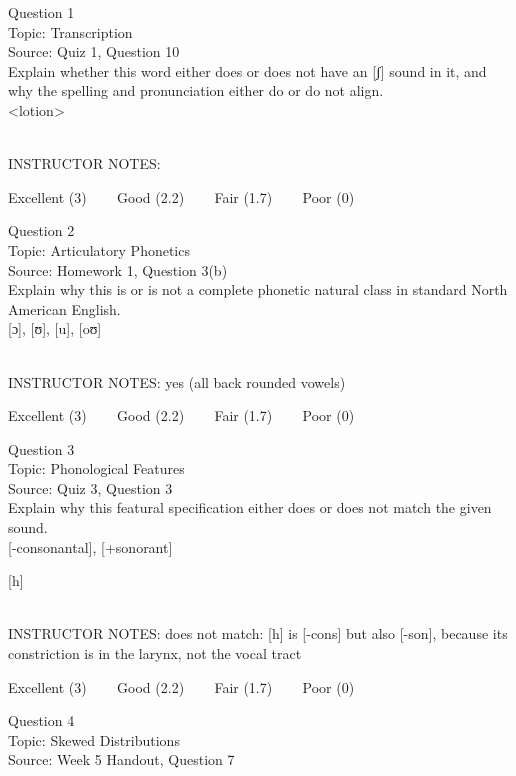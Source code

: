 \documentclass[12pt]{article}
\begin{document}
{\large Question 1}\\

Topic: Transcription\\
Source: Quiz 1, Question 10\\

Explain whether this word either does or does not have an [ʃ] sound in it, and why the spelling and pronunciation either do or do not align.\\

<lotion>


~\\
INSTRUCTOR NOTES: 


\vfill
Excellent (3) ~~~ Good (2.2) ~~~ Fair (1.7) ~~~ Poor (0)
\newpage

{\large Question 2}\\

Topic: Articulatory Phonetics\\
Source: Homework 1, Question 3(b)\\

Explain why this is or is not a complete phonetic natural class in standard North American English.\\

{[ɔ]}, {[ʊ]}, {[u]}, {[oʊ]}


~\\
INSTRUCTOR NOTES: yes (all back rounded vowels)


\vfill
Excellent (3) ~~~ Good (2.2) ~~~ Fair (1.7) ~~~ Poor (0)
\newpage

{\large Question 3}\\

Topic: Phonological Features\\
Source: Quiz 3, Question 3\\

Explain why this featural specification either does or does not match the given sound.\\

{[-consonantal]}, {[+sonorant]}

{[h]}


~\\
INSTRUCTOR NOTES: does not match: [h] is [-cons] but also [-son], because its constriction is in the larynx, not the vocal tract


\vfill
Excellent (3) ~~~ Good (2.2) ~~~ Fair (1.7) ~~~ Poor (0)
\newpage

{\large Question 4}\\

Topic: Skewed Distributions\\
Source: Week 5 Handout, Question 7\\
\end{document}
